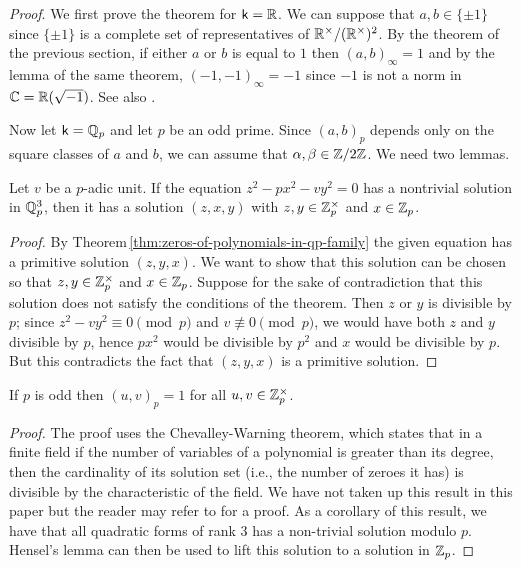 \emph{Proof}. We first prove the theorem for \(\mathsf{k} = \mathbb{R}\). We can suppose that \(a, b \in \{\pm 1\}\) since \(\{\pm 1\}\) is a complete set of representatives of \(\mathbb{R}^{\times}/(\mathbb{R}^{\times})^2\). By the theorem of the previous section, if either \(a\) or \(b\) is equal to \(1\) then \((a, b)_{\infty} = 1\) and by the lemma of the same theorem, \((-1, -1)_{\infty} = -1\) since \(-1\) is not a norm in \(\mathbb{C} = \mathbb{R}(\sqrt{-1})\). See also \cite[Theorem~10.4]{sutherland2013introduction}.

Now let \(\mathsf{k} = \mathbb{Q}_p\) and let \(p\) be an odd prime. Since \((a, b)_p\) depends only on the square classes of \(a\) and \(b\), we can assume that \(\alpha, \beta \in \mathbb{Z}/ 2\mathbb{Z}\). We need two lemmas.

\begin{lemmax}\label{lem:serre-sol-zp}
    {\normalfont\cite[p.~21]{serre2012course}}
    Let \(v\) be a \(p\)-adic unit. If the equation \(z^2 - px^2 - vy^2 = 0\) has a nontrivial solution in \(\mathbb{Q}_p^3\), then it has a solution \((z, x, y)\) with \(z, y \in \mathbb{Z}_p^{\times}\) and \(x \in \mathbb{Z}_p\).
\end{lemmax}

\begin{proof}
    By Theorem\,\ref{thm:zeros-of-polynomials-in-qp-family} the given equation has a primitive solution \((z, y, x)\). We want to show that this solution can be chosen so that \(z, y \in \mathbb{Z}_p^{\times}\) and \(x \in \mathbb{Z}_p\). Suppose for the sake of contradiction that this solution does not satisfy the conditions of the theorem. Then \(z\) or \(y\) is divisible by \(p\); since \(z^2 - vy^2 \equiv 0 \pmod{p}\) and \(v \not\equiv 0 \pmod{p}\), we would have both \(z\) and \(y\) divisible by \(p\), hence \(px^2\) would be divisible by \(p^2\) and \(x\) would be divisible by \(p\). But this contradicts the fact that \((z, y, x)\) is a primitive solution.
\end{proof}

\begin{lemmax}\label{lem:hilbert-odd-units}
    {\normalfont\cite[Lemma~10.5]{sutherland2013introduction}}
    If \(p\) is odd then \((u, v)_p = 1\) for all \(u, v \in \mathbb{Z}_p^{\times}\).
\end{lemmax}

\begin{proof}
    The proof uses the Chevalley-Warning theorem, which states that in a finite field if the number of variables of a polynomial is greater than its degree, then the cardinality of its solution set (i.e., the number of zeroes it has) is divisible by the characteristic of the field. We have not taken up this result in this paper but the reader may refer to \cite[p.~5]{serre2012course} for a proof. As a corollary of this result, we have that all quadratic forms of rank \(3\) has a non-trivial solution modulo \(p\). Hensel's lemma can then be used to lift this solution to a solution in \(\mathbb{Z}_p\).
\end{proof}


